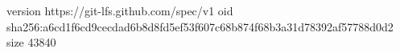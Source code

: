 version https://git-lfs.github.com/spec/v1
oid sha256:a6cd1f6cd9cecdad6b8d8fd5ef53f607c68b874f68b3a31d78392af57788d0d2
size 43840
